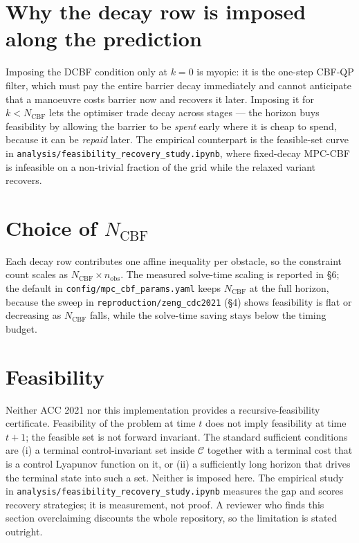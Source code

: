 \documentclass[11pt]{article}
\begin{document}
\section{Why the decay row is imposed along the prediction}
Imposing the DCBF condition only at $k=0$ is myopic: it is the one-step CBF-QP filter, which must
pay the entire barrier decay immediately and cannot anticipate that a manoeuvre costs barrier now
and recovers it later. Imposing it for $k < N_{\mathrm{CBF}}$ lets the optimiser trade decay across
stages --- the horizon buys feasibility by allowing the barrier to be \emph{spent} early where it
is cheap to spend, because it can be \emph{repaid} later. The empirical counterpart is the
feasible-set curve in \texttt{analysis/feasibility\_recovery\_study.ipynb}, where fixed-decay
MPC-CBF is infeasible on a non-trivial fraction of the grid while the relaxed variant recovers.

\section{Choice of $N_{\mathrm{CBF}}$}
Each decay row contributes one affine inequality per obstacle, so the constraint count scales as
$N_{\mathrm{CBF}} \times n_{\mathrm{obs}}$. The measured solve-time scaling is reported in \S6; the
default in \texttt{config/mpc\_cbf\_params.yaml} keeps $N_{\mathrm{CBF}}$ at the full horizon,
because the sweep in \texttt{reproduction/zeng\_cdc2021} (\S4) shows feasibility is flat or
decreasing as $N_{\mathrm{CBF}}$ falls, while the solve-time saving stays below the timing budget.

\section{Feasibility}
Neither ACC 2021 nor this implementation provides a recursive-feasibility certificate. Feasibility
of the problem at time $t$ does not imply feasibility at time $t+1$; the feasible set is not
forward invariant. The standard sufficient conditions are (i) a terminal control-invariant set
inside $\mathcal{C}$ together with a terminal cost that is a control Lyapunov function on it, or
(ii) a sufficiently long horizon that drives the terminal state into such a set. Neither is
imposed here. The empirical study in \texttt{analysis/feasibility\_recovery\_study.ipynb} measures
the gap and scores recovery strategies; it is measurement, not proof. A reviewer who finds this
section overclaiming discounts the whole repository, so the limitation is stated outright.
\end{document}
